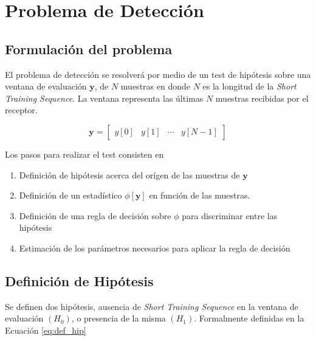 \chapter{Problema de Detección}
\label{Ch:4}
\graphicspath{{figs/}}



\section{Formulaci\'{o}n del problema}
\label{S:form-del-probl}

El problema de detección se resolverá por medio de un test de hipótesis sobre una ventana de evaluación $\mathbf{y}$, de $N$ muestras en donde $N$ es la longitud de la \textit{Short Training Sequence}. La ventana representa las últimas $N$ muestras recibidas por el receptor.

\begin{equation}\label{eq:def_y}
    \mathbf{y} = \begin{bmatrix}
        y[0] & y[1] & \cdots & y[N-1]
    \end{bmatrix}
\end{equation}

Los pasos para realizar el test consisten en

\begin{enumerate}
    \item Definición de hipótesis acerca del orígen de las muestras de $\mathbf{y}$
    \item Definición de un estadístico $\phi\left[\mathbf{y}\right]$ en función de las muestras.
    \item Definición de una regla de decisión sobre $\phi$ para discriminar entre las hipótesis
    \item Estimación de los parámetros necesarios para aplicar la regla de decisión
\end{enumerate}


\section{Definición de Hipótesis}
\label{S:hipotesis}

Se definen dos hipótesis, ausencia de \textit{Short Training Sequence} en la ventana de evaluación $(H_0)$, o presencia de la misma $(H_1)$. Formalmente definidas en la Ecuación \ref{eq:def_hip}

